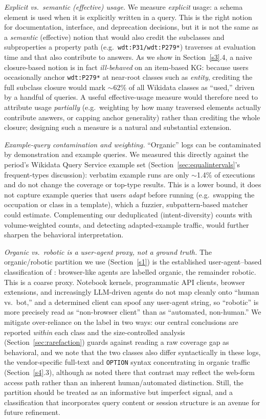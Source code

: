 \documentclass[sw]{iosart2x}
\begin{document}
\emph{Explicit vs.\ semantic (effective) usage.} We measure \emph{explicit} usage: a schema element is used when it is explicitly written in a query. This is the right notion for documentation, interface, and deprecation decisions, but it is not the same as a \emph{semantic} (effective) notion that would also credit the subclasses and subproperties a property path (e.g.\ \texttt{wdt:P31/wdt:P279*}) traverses at evaluation time and that also contribute to answers. As we show in Section~\ref{s3}.4, a naive closure-based notion is in fact \emph{ill-behaved} on an item-based KG: because users occasionally anchor \texttt{wdt:P279*} at near-root classes such as \emph{entity}, crediting the full subclass closure would mark $\sim$62\% of all Wikidata classes as ``used,'' driven by a handful of queries. A useful effective-usage measure would therefore need to attribute usage \emph{partially} (e.g.\ weighting by how many traversed elements actually contribute answers, or capping anchor generality) rather than crediting the whole closure; designing such a measure is a natural and substantial extension.


\emph{Example-query contamination and weighting.} ``Organic'' logs can be contaminated by demonstration and example queries. We measured this directly against the period's Wikidata Query Service example set (Section~\ref{sec:equalintervals}'s frequent-types discussion): verbatim example runs are only $\sim$1.4\% of executions and do not change the coverage or top-type results. This is a lower bound, it does not capture example queries that users \emph{adapt} before running (e.g.\ swapping the occupation or class in a template), which a fuzzier, subpattern-based matcher could estimate. Complementing our deduplicated (intent-diversity) counts with volume-weighted counts, and detecting adapted-example traffic, would further sharpen the behavioral interpretation.

\emph{Organic vs.\ robotic is a user-agent proxy, not a ground truth.} The organic/robotic partition we use (Section~\ref{s1}) is the established user-agent--based classification of \cite{malyshev2018getting,bielefeldt2018practical}: browser-like agents are labelled organic, the remainder robotic. This is a coarse proxy. Notebook kernels, programmatic API clients, browser extensions, and increasingly LLM-driven agents do not map cleanly onto ``human vs.\ bot,'' and a determined client can spoof any user-agent string, so ``robotic'' is more precisely read as ``non-browser client'' than as ``automated, non-human.'' We mitigate over-reliance on the label in two ways: our central conclusions are reported \emph{within} each class and the size-controlled analysis (Section~\ref{sec:rarefaction}) guards against reading a raw coverage gap as behavioral, and we note that the two classes also differ syntactically in these logs, the vendor-specific full-text and \texttt{OPTION} syntax concentrating in organic traffic (Section~\ref{s4}.3), although as noted there that contrast may reflect the web-form access path rather than an inherent human/automated distinction. Still, the partition should be treated as an informative but imperfect signal, and a classification that incorporates query content or session structure is an avenue for future refinement.
\end{document}
